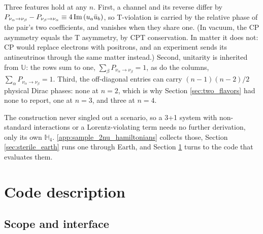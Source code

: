 \documentclass[final,5p,times,twocolumn,sort,compress]{elsarticle}
\begin{document}
Three features hold at any $n$.  First, a channel and its reverse differ by $P_{\nu_\alpha \to \nu_\beta} - P_{\nu_\beta \to \nu_\alpha} \equiv 4\,{\rm Im}\left(u_a \bar{u}_b\right)$, so T-violation is carried by the relative phase of the pair's two coefficients, and vanishes when they share one.  (In vacuum, the CP asymmetry equals the T asymmetry, by CPT conservation.  In matter it does not: CP would replace electrons with positrons, and an experiment sends its antineutrinos through the same matter instead.)  Second, unitarity is inherited from $\mathbb{U}$: the rows sum to one, $\sum_\beta P_{\nu_\alpha \to \nu_\beta} = 1$, as do the columns, $\sum_\alpha P_{\nu_\alpha \to \nu_\beta} = 1$.  Third, the off-diagonal entries can carry $(n-1)(n-2)/2$ physical Dirac phases: none at $n=2$, which is why Section \ref{sec:two_flavors} had none to report, one at $n=3$, and three at $n=4$.

The construction never singled out a scenario, so a 3+1 system with non-standard interactions or a Lorentz-violating term needs no further derivation, only its own $\mathbb{H}_4$.  \ref{app:sample_2nu_hamiltonians} collects those, Section \ref{sec:sterile_earth} runs one through Earth, and Section \ref{sec:code} turns to the code that evaluates them.


\section{Code description}
\label{sec:code}


\subsection{Scope and interface}
\end{document}

